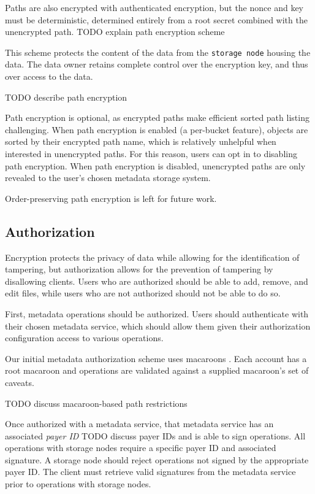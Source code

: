 \documentclass[a4paper,10pt]{article} \usepackage[utf8]{inputenc}
\newcommand{\x}[1]{{\tt #1}} \newcommand{\code}[1]{{\tt #1}}
\newcommand{\todo}[1]{{\color{red} TODO #1 }}
\begin{document}
Paths are also encrypted with authenticated encryption, but the nonce and key
must be deterministic, determined entirely from a root secret combined with the
unencrypted path. \todo{explain path encryption scheme}

This scheme protects the
content of the data from the \x{storage node} housing the data. The data owner
retains complete control over the encryption key, and thus over access to the
data.

\todo{describe path encryption}

Path encryption is optional, as encrypted paths make efficient sorted path
listing challenging. When path encryption is enabled (a per-bucket feature),
objects are sorted by their encrypted path name, which is relatively unhelpful
when interested in unencrypted paths. For this reason, users can opt in to
disabling path encryption. When path encryption is disabled, unencrypted paths
are only revealed to the user's chosen metadata storage system.

Order-preserving path encryption is left for future work.

\subsection{Authorization}

Encryption protects the privacy of data while allowing for the identification
of tampering, but authorization allows for the prevention of tampering by
disallowing clients. Users who are authorized should be able to add, remove,
and edit files, while users who are not authorized should not be able to do so.

First, metadata operations should be authorized. Users should authenticate with
their chosen metadata service, which should allow them given their authorization
configuration access to various operations.

Our initial metadata authorization scheme uses macaroons \cite{macaroons}.
Each account has a root macaroon and operations are validated against a supplied
macaroon's set of caveats.

\todo{discuss macaroon-based path restrictions}

Once authorized with a metadata service, that metadata service has an associated
{\em payer ID} \todo{discuss payer IDs} and is able to sign operations. All
operations with storage nodes require a specific payer ID and associated
signature. A storage node should reject operations not signed by the appropriate
payer ID. The client must retrieve valid signatures from the metadata service
prior to operations with storage nodes.
\end{document}
